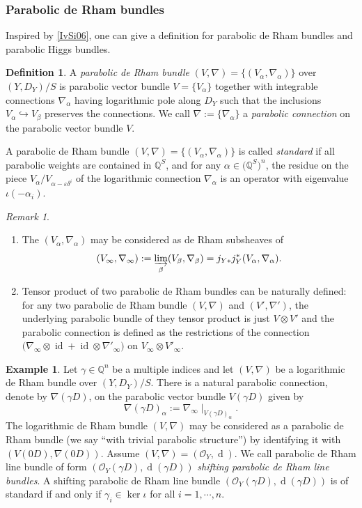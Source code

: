 \documentclass[12pt,twoside]{book}
\theoremstyle{plain}
\theoremstyle{definition}
\newtheorem{definition}[definition]{Definition}
\newtheorem{example}[example]{Example}
\theoremstyle{remark}
\newtheorem{remark}[remark]{Remark}
\newcommand{\bQ}{{\mathbb Q}}
\newcommand{\mO}{{\mathcal O}}
\DeclareMathOperator\rmd{d}
\DeclareMathOperator\id{id}
\numberwithin{equation}{section}
\begin{document}
\subsubsection{Parabolic de Rham bundles}

Inspired by \autoref{IvSi06}, one can give a definition for parabolic de Rham bundles and parabolic Higgs bundles.
\begin{definition}
A \emph{parabolic de Rham bundle} $(V,\nabla)=\{(V_\alpha,\nabla_\alpha)\}$ over $(Y,D_Y)/S$ is parabolic vector bundle $V=\{V_\alpha\}$ together with integrable connections $\nabla_\alpha$ having logarithmic pole along $D_Y$ such that the inclusions $V_\alpha\hookrightarrow V_\beta$ preserves the connections.
We call $\nabla:=\{\nabla_\alpha\}$ a \emph{parabolic connection} on the parabolic vector bundle $V$.

A parabolic de Rham bundle $(V,\nabla)=\{(V_\alpha,\nabla_\alpha)\}$
is called \emph{standard} if all parabolic weights are contained in $\bQ^{S}$, and for any $\alpha\in \Big(\bQ^{S}\Big)^n$, the residue on the piece $V_\alpha/V_{\alpha-\varepsilon\delta^i}$ of the logarithmic connection $\nabla_\alpha$ is an operator with eigenvalue $\iota(-\alpha_i)$.
\end{definition}

\begin{remark}
\begin{enumerate}
\item[(1).] The $(V_\alpha,\nabla_\alpha)$ may be considered as de Rham subsheaves of
\[(V_\infty,\nabla_\infty) := \varinjlim_\beta (V_\beta,\nabla_\beta) = j_{Y*}j^*_Y (V_\alpha,\nabla_\alpha).\]
\item[(2).] Tensor product of two parabolic de Rham bundles can be naturally defined: for any two parabolic de Rham bundle $(V,\nabla)$ and $(V',\nabla')$, the underlying parabolic bundle of they tensor product is just $V\otimes V'$ and the parabolic connection is defined as the restrictions of the connection $\Big(\nabla_\infty\otimes \id + \id\otimes\nabla'_\infty\Big)$ on $V_\infty\otimes V'_\infty$.
\end{enumerate}
\end{remark}

\begin{example} Let $\gamma\in\bQ^n$ be a multiple indices and let $(V,\nabla)$ be a logarithmic de Rham bundle over $(Y,D_Y)/S$. There is a natural parabolic connection, denote by $\nabla(\gamma D)$, on the parabolic vector bundle $V(\gamma D)$ given by
\[\nabla(\gamma D)_\alpha:=\nabla_\infty \mid_{V(\gamma D)_{\alpha}}.\]
The logarithmic de Rham bundle $(V,\nabla)$ may be considered as a parabolic de Rham bundle (we say ``with trivial parabolic structure'') by identifying it with $(V(0D),\nabla(0D))$.
Assume $(V,\nabla)=(\mO_Y,\rmd)$. We call parabolic de Rham line bundle of form $(\mO_Y(\gamma D),\rmd(\gamma D))$ \emph{shifting parabolic de Rham line bundles}. A shifting parabolic de Rham line bundle $(\mO_Y(\gamma D),\rmd(\gamma D))$ is of standard if and only if $\gamma_i\in \ker\iota$ for all $i=1,\cdots,n$.
\end{example}
\end{document}
